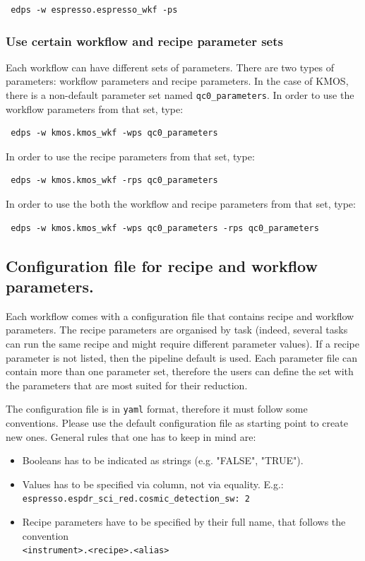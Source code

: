 \begin{verbatim}
 edps -w espresso.espresso_wkf -ps
\end{verbatim}

\subsubsection{Use certain workflow and recipe parameter sets}
Each workflow can have different sets of parameters. There are two types of parameters: workflow parameters and recipe parameters. In the case of KMOS, there is a non-default parameter set named {\tt qc0\_parameters}. In order to use the workflow parameters from that set, type: 
\begin{verbatim}
 edps -w kmos.kmos_wkf -wps qc0_parameters
\end{verbatim}

In order to use the recipe parameters from that set, type: 
\begin{verbatim}
 edps -w kmos.kmos_wkf -rps qc0_parameters
\end{verbatim}


In order to use the both the workflow and recipe parameters from that set, type: 
\begin{verbatim}
 edps -w kmos.kmos_wkf -wps qc0_parameters -rps qc0_parameters
\end{verbatim}


\subsection{Configuration file for recipe and workflow parameters.}
\label{sec:edps_parameters_file}

Each workflow comes with a configuration file that contains recipe and workflow parameters. The recipe parameters are organised by task (indeed, several tasks can run the same recipe and might require different parameter values). If a recipe parameter is not listed, then the pipeline default is used. 
Each parameter file can contain more than one parameter set, therefore the users can define the set with the parameters that are most suited for their reduction. 


The configuration file is in {\tt yaml} format, therefore it must follow some conventions. Please use the default configuration file as starting point to create new ones. General rules that one has to keep in mind are:

\begin{itemize}
    \item Booleans has to be indicated as strings (e.g. "FALSE", "TRUE").
    \item Values has to be specified via column, not via equality. E.g.:\\ {\tt espresso.espdr\_sci\_red.cosmic\_detection\_sw: 2}
    \item Recipe parameters have to be specified by their full name, that follows the convention \\ {\tt <instrument>.<recipe>.<alias>}
\end{itemize}


